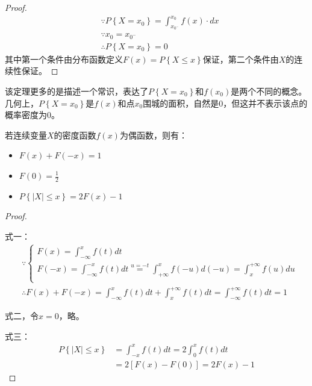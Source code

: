 \begin{proof}
\begin{align*}
&\because P\left\{ X=x_0 \right\} =\int_{x_{0^-}}^{x_0}{f\left( x \right) \cdot dx} \\
&\because x_0=x_{0^-} \\
&\therefore P\left\{ X=x_0 \right\} =0
\end{align*}
其中第一个条件由分布函数定义$F\left( x \right) =P\left\{ X\leqslant x \right\} $保证，第二个条件由$X$的连续性保证。
\end{proof}

该定理更多的是描述一个常识，表达了$P\left\{ X=x_0 \right\} $和$f\left( x_0 \right) $是两个不同的概念。
几何上，$P\left\{ X=x_0 \right\} $是$f\left( x \right) $和点$x_0$围城的面积，自然是0，但这并不表示该点的概率密度为0。

\begin{theorem}
若连续变量$X$的密度函数$f\left( x \right) $为偶函数，则有：
\begin{itemize}
    \item $F\left( x \right) +F\left( -x \right) =1$
    \item $F\left( 0 \right) =\frac{1}{2}$
    \item $P\left\{ \left| X \right|\leqslant x \right\} =2F\left( x \right) -1$
\end{itemize}
\end{theorem}

\begin{proof}

~

式一：
\begin{align*}
&\because \begin{cases}
	F\left( x \right) =\int_{-\infty}^x{f\left( t \right) dt}\\
	F\left( -x \right) =\int_{-\infty}^{-x}{f\left( t \right) dt}\overset{u=-t}{=}\int_{+\infty}^x{f\left( -u \right) d\left( -u \right)}=\int_x^{+\infty}{f\left( u \right) du}\\
\end{cases} \\
&\therefore F\left( x \right) +F\left( -x \right) =\int_{-\infty}^x{f\left( t \right) dt}+\int_x^{+\infty}{f\left( t \right) dt}=\int_{-\infty}^{+\infty}{f\left( t \right) dt}=1
\end{align*}

式二，令$x=0$，略。

式三：
\begin{align*}
P\left\{ \left| X \right|\leqslant x \right\} &=\int_{-x}^x{f\left( t \right) dt}=2\int_0^x{f\left( t \right) dt}\\
&=2\left[ F\left( x \right) -F\left( 0 \right) \right] =2F\left( x \right) -1	
\end{align*}
\end{proof}


